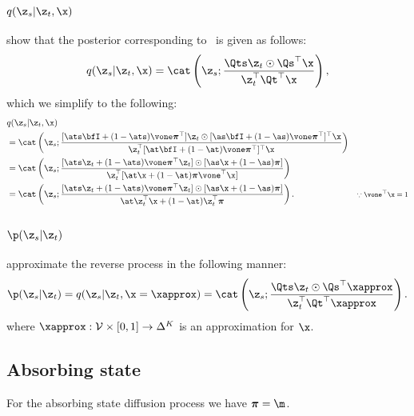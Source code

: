 \documentclass{article} %
\def\prior{\text{$\boldsymbol{\mathit{\pi}}$}}
\def\onehotset{\mathcal{V}}
\begin{document}
{\begin{appendices}
\subsubsection{\texorpdfstring{$q(\z_s | \z_t, \x)$}{Lg}}
\citet{austin2021structured} show that the posterior corresponding to~ is given as follows:
\begin{align}
    q(\z_s | \z_t, \x) = \cat \left(
        \z_s; \frac{\Qts \z_t \odot \Qs^\top\x}{
            \z_t^\top \Qt^\top \x} \right), \label{eqn:d3pm_q_st_discrete_old}
\end{align}
which we simplify to the following:
\begin{align}\label{supp:eqn:d3pm_posterior_generic}
    & q(\z_s | \z_t, \x) & \nonumber \\
    & = \cat \left(
        \z_s; \frac{[\ats \bfI+ (1 - \ats)\vone \prior^\top] \z_t \odot [\as \bfI+ (1 - \as)\vone \prior^\top]^\top\x}{
            \z_t^\top [\at \bfI+ (1 - \at)\vone \prior^\top]^\top \x} \right) & \nonumber \\
    & = \cat \left(
        \z_s; \frac{[\ats \z_t + (1 - \ats)\vone \prior^\top \z_t]  \odot [\as \x + (1 - \as) \prior]}{
             \z_t^\top [\at \x + (1 - \at)\prior\vone^\top\x] } \right) & \nonumber \\
    & = \cat \left(
        \z_s; \frac{[\ats \z_t + (1 - \ats)\vone \prior^\top \z_t]  \odot [\as \x + (1 - \as) \prior]}{
             \at \z_t^\top \x  + (1 - \at)\z_t^\top\prior} \right). & \text{\footnotesize $\because \vone^\top\x = 1$}
\end{align}

\subsubsection{\texorpdfstring{$\p(\z_s | \z_t)$}{Lg}}
\citet{austin2021structured} approximate the reverse process in the following manner: 
\begin{align}\label{supp:eqn:d3pm_p_st_approx_old}
    \p(\z_s | \z_t) = q(\z_s | \z_t, \x=\xapprox) =
     \cat \left(
        \z_s; \frac{\Qts \z_t \odot \Qs^\top \xapprox}{
            \z_t^\top \Qt^\top \xapprox} \right).
\end{align}
where $\xapprox: \onehotset \times [0, 1] \rightarrow \Delta^{K}$ is an approximation for $\x$.

\subsection{Absorbing state}\label{supp:subsec:d3pm_absorbing}
For the absorbing state diffusion process we have $\prior{} = \m$.


\end{appendices}}
\end{document}
